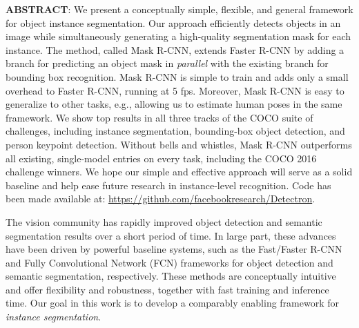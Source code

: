 \textbf{ABSTRACT}: We present a conceptually simple, flexible, and general framework for object instance segmentation. Our approach efficiently detects objects in an image while simultaneously generating a high-quality segmentation mask for each instance. The method, called Mask R-CNN, extends Faster R-CNN by adding a branch for predicting an object mask in \emph{parallel} with the existing branch for bounding box recognition. Mask R-CNN is simple to train and adds only a small overhead to Faster R-CNN, running at 5 fps. Moreover, Mask R-CNN is easy to generalize to other tasks, e.g., allowing us to estimate human poses in the same framework. We show top results in all three tracks of the COCO suite of challenges, including instance segmentation, bounding-box object detection, and person keypoint detection. Without bells and whistles, Mask R-CNN outperforms all existing, single-model entries on every task, including the COCO 2016 challenge winners. We hope our simple and effective approach will serve as a solid baseline and help ease future research in instance-level recognition. Code has been made available at: \url{https://github.com/facebookresearch/Detectron}.


The vision community has rapidly improved object detection and semantic segmentation results over a short period of time. In large part, these advances have been driven by powerful baseline systems, such as the Fast/Faster R-CNN and Fully Convolutional Network (FCN) frameworks for object detection and semantic segmentation, respectively. These methods are conceptually intuitive and offer flexibility and robustness, together with fast training and inference time. Our goal in this work is to develop a comparably enabling framework for \emph{instance segmentation}.

